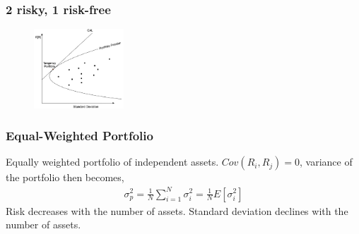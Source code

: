 \begin{multicols}{2}
\subsubsection{2 risky, 1 risk-free}
\begin{figure}[H]
    \centering
    \includegraphics[width =0.3\textwidth]{Figure/cal.png}
\end{figure}
\subsubsection{Equal-Weighted Portfolio}
Equally weighted portfolio of independent assets. $Cov(R_i,R_j)=0$, variance of the portfolio then becomes, 
\begin{gather*}
    \sigma_p^2 = \frac{1}{N}\sum_{i=1}^{N}\sigma_i^2 = \frac{1}{N}E[\sigma_i^2]
\end{gather*}
Risk decreases with the number of assets. Standard deviation declines with the number of assets.


\end{multicols}